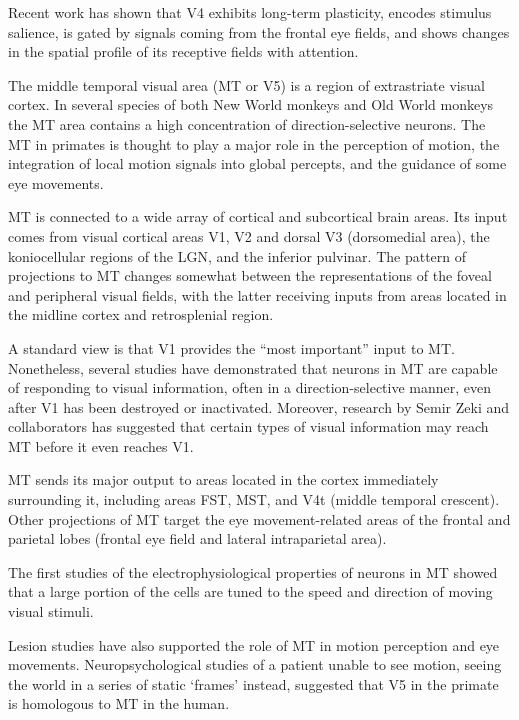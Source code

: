 Recent work has shown that V4 exhibits long-term plasticity, encodes stimulus salience, is gated by signals coming from the frontal eye fields, and shows changes in the spatial profile of its receptive fields with attention.

The middle temporal visual area (MT or V5) is a region of extrastriate visual cortex. In several species of both New World monkeys and Old World monkeys the MT area contains a high concentration of direction-selective neurons. The MT in primates is thought to play a major role in the perception of motion, the integration of local motion signals into global percepts, and the guidance of some eye movements.

MT is connected to a wide array of cortical and subcortical brain areas. Its input comes from visual cortical areas V1, V2 and dorsal V3 (dorsomedial area), the koniocellular regions of the LGN, and the inferior pulvinar. The pattern of projections to MT changes somewhat between the representations of the foveal and peripheral visual fields, with the latter receiving inputs from areas located in the midline cortex and retrosplenial region.

A standard view is that V1 provides the ``most important'' input to MT. Nonetheless, several studies have demonstrated that neurons in MT are capable of responding to visual information, often in a direction-selective manner, even after V1 has been destroyed or inactivated. Moreover, research by Semir Zeki and collaborators has suggested that certain types of visual information may reach MT before it even reaches V1.

MT sends its major output to areas located in the cortex immediately surrounding it, including areas FST, MST, and V4t (middle temporal crescent). Other projections of MT target the eye movement-related areas of the frontal and parietal lobes (frontal eye field and lateral intraparietal area).

The first studies of the electrophysiological properties of neurons in MT showed that a large portion of the cells are tuned to the speed and direction of moving visual stimuli.

Lesion studies have also supported the role of MT in motion perception and eye movements. Neuropsychological studies of a patient unable to see motion, seeing the world in a series of static `frames' instead, suggested that V5 in the primate is homologous to MT in the human.

